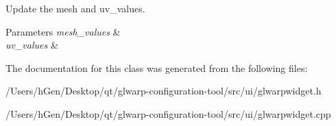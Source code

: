 Update the mesh and uv\+\_\+values. 


\begin{DoxyParams}{Parameters}
{\em mesh\+\_\+values} & \\
\hline
{\em uv\+\_\+values} & \\
\hline
\end{DoxyParams}


The documentation for this class was generated from the following files\+:\begin{DoxyCompactItemize}
\item 
/\+Users/h\+Gen/\+Desktop/qt/glwarp-\/configuration-\/tool/src/ui/glwarpwidget.\+h\item 
/\+Users/h\+Gen/\+Desktop/qt/glwarp-\/configuration-\/tool/src/ui/glwarpwidget.\+cpp\end{DoxyCompactItemize}
